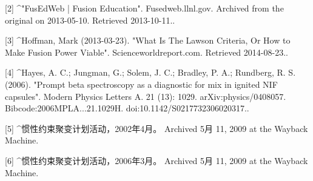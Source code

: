 [2]
^"FusEdWeb | Fusion Education". Fusedweb.llnl.gov. Archived from the original on 2013-05-10. Retrieved 2013-10-11..

[3]
^Hoffman, Mark (2013-03-23). "What Is The Lawson Criteria, Or How to Make Fusion Power Viable". Scienceworldreport.com. Retrieved 2014-08-23..

[4]
^Hayes, A. C.; Jungman, G.; Solem, J. C.; Bradley, P. A.; Rundberg, R. S. (2006). "Prompt beta spectroscopy as a diagnostic for mix in ignited NIF capsules". Modern Physics Letters A. 21 (13): 1029. arXiv:physics/0408057. Bibcode:2006MPLA...21.1029H. doi:10.1142/S0217732306020317..

[5]
^惯性约束聚变计划活动，2002年4月。 Archived 5月 11, 2009 at the Wayback Machine.

[6]
^惯性约束聚变计划活动，2006年3月。 Archived 5月 11, 2009 at the Wayback Machine.

